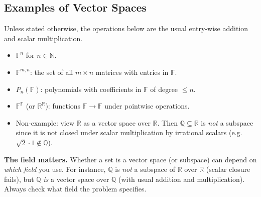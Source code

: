 
\subsection{Examples of Vector Spaces}


Unless stated otherwise, the operations below are the usual entry-wise addition and scalar multiplication.

\begin{itemize}[leftmargin=*]

\item $\mathbb{F}^n$ for $n\in\mathbb{N}$.

\item $\mathbb{F}^{m,n}$: the set of all $m\times n$ matrices with entries in $\mathbb{F}$.

\item $P_n(\mathbb{F})$: polynomials with coefficients in $\mathbb{F}$ of degree $\le n$.

\item $\mathbb{F}^{\mathbb{F}}$ (or $\mathbb{R}^{\mathbb{R}}$): functions $\mathbb{F}\to\mathbb{F}$ under pointwise operations.

\item Non-example: view $\mathbb{R}$ as a vector space over $\mathbb{R}$. Then $\mathbb{Q}\subseteq \mathbb{R}$ is \emph{not} a subspace since it is not closed under scalar multiplication by irrational scalars (e.g.\ $\sqrt{2}\cdot 1\notin\mathbb{Q}$).

\end{itemize}

\begin{policynote}
\textbf{The field matters.}
Whether a set is a vector space (or subspace) can depend on \emph{which field} you use.
For instance, $\mathbb{Q}$ is \emph{not} a subspace of $\mathbb{R}$ over $\mathbb{R}$ (scalar closure fails), but $\mathbb{Q}$ \emph{is} a vector space over $\mathbb{Q}$ (with usual addition and multiplication).
Always check what field the problem specifies.
\end{policynote}


